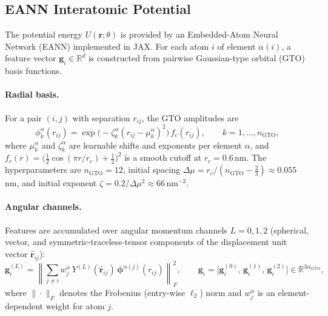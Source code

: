 \documentclass{article}
\newcommand{\R}{\mathbb{R}}
\newcommand{\EANN}{\textsc{EANN}}
\begin{document}
\subsection{EANN Interatomic Potential}
\label{sec:eann}

The potential energy $U(\bm{r};\theta)$ is provided by an Embedded-Atom Neural
Network (\EANN) \cite{eann2020} implemented in JAX.  For each atom $i$ of
element $\alpha(i)$, a feature vector $\bm{g}_i \in \R^{d}$ is constructed
from pairwise Gaussian-type orbital (GTO) basis functions.

\paragraph{Radial basis.}
For a pair $(i,j)$ with separation $r_{ij}$, the GTO amplitudes are
\begin{equation}
  \phi_k^{\alpha}(r_{ij})
    = \exp\!\bigl(-\zeta_k^\alpha (r_{ij} - \mu_k^\alpha)^2\bigr)\,
      f_c(r_{ij}),
  \qquad k = 1,\ldots,n_\mathrm{GTO},
\end{equation}
where $\mu_k^\alpha$ and $\zeta_k^\alpha$ are learnable shifts and exponents
per element $\alpha$, and $f_c(r) = \bigl(\tfrac{1}{2}\cos(\pi r/r_c) +
\tfrac{1}{2}\bigr)^2$ is a smooth cutoff at $r_c = 0.6$\,nm.  The
hyperparameters are $n_\mathrm{GTO} = 12$, initial spacing
$\Delta\mu = r_c/(n_\mathrm{GTO}-\tfrac{2}{3}) \approx 0.055$\,nm, and
initial exponent $\zeta = 0.2/\Delta\mu^2 \approx 66$\,nm$^{-2}$.

\paragraph{Angular channels.}
Features are accumulated over angular momentum channels $L = 0, 1, 2$
(spherical, vector, and symmetric-traceless-tensor components of the
displacement unit vector $\hat{\bm{r}}_{ij}$):
\begin{equation}
  \bm{g}_i^{(L)}
    = \left\|
        \sum_{j \neq i}
          w^\alpha_j\,
          Y^{(L)}(\hat{\bm{r}}_{ij})\,
          \bm{\phi}^{\alpha(j)}(r_{ij})
      \right\|^2_F,
  \qquad
  \bm{g}_i = \bigl[\bm{g}_i^{(0)},\,\bm{g}_i^{(1)},\,\bm{g}_i^{(2)}\bigr]
  \in \R^{3 n_\mathrm{GTO}},
\end{equation}
where $\|\cdot\|_F$ denotes the Frobenius (entry-wise $\ell_2$) norm and
$w^\alpha_j$ is an element-dependent weight for atom $j$.
\end{document}
